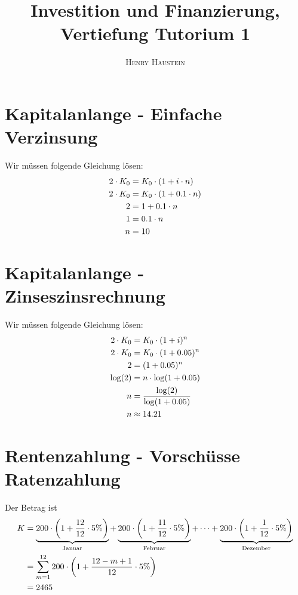 \documentclass{article}
\title{\textbf{Investition und Finanzierung, Vertiefung Tutorium 1}}
\author{\textsc{Henry Haustein}}
\date{}
\begin{document}
	\maketitle
	
	\section*{Kapitalanlange - Einfache Verzinsung}
	Wir müssen folgende Gleichung lösen:
	\begin{align}
		2\cdot K_0 &= K_0\cdot (1+i\cdot n) \notag \\
		2\cdot K_0 &= K_0\cdot (1 + 0.1\cdot n) \notag \\
		2 &= 1+0.1\cdot n \notag \\
		1 &= 0.1 \cdot n \notag \\
		n &= 10 \notag
	\end{align}

	\section*{Kapitalanlange - Zinseszinsrechnung}
	Wir müssen folgende Gleichung lösen:
	\begin{align}
		2\cdot K_0 &= K_0\cdot (1+i)^n \notag \\
		2\cdot K_0 &= K_0\cdot (1 + 0.05)^n \notag \\
		2 &= (1+0.05)^n \notag \\
		\log(2) &= n\cdot \log(1+0.05) \notag \\
		n &= \frac{\log(2)}{\log(1+0.05)} \notag \\
		n &\approx 14.21 \notag 
	\end{align}

	\section*{Rentenzahlung - Vorschüsse Ratenzahlung}
	Der Betrag ist
	\begin{align}
		K &= \underbrace{200\cdot \left(1+\frac{12}{12}\cdot 5\%\right)}_{\text{Januar}} + \underbrace{200\cdot \left(1+\frac{11}{12}\cdot 5\%\right)}_{\text{Februar}} + \dots + \underbrace{200\cdot \left(1+\frac{1}{12}\cdot 5\%\right)}_{\text{Dezember}} \notag \\
		&= \sum_{m=1}^{12} 200\cdot\left(1+\frac{12-m+1}{12}\cdot 5\%\right) \notag \\
		&= 2465 \notag
	\end{align}
\end{document}
